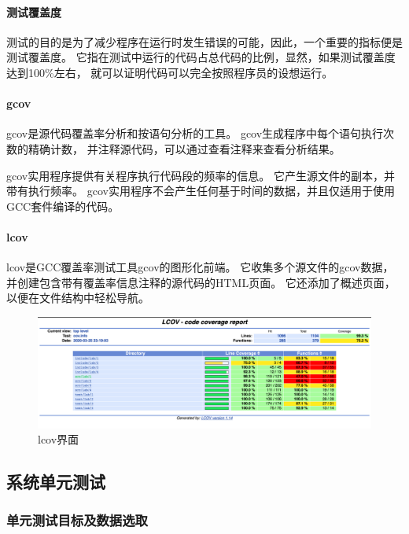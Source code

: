 \paragraph{测试覆盖度}

测试的目的是为了减少程序在运行时发生错误的可能，因此，一个重要的指标便是测试覆盖度。
它指在测试中运行的代码占总代码的比例，显然，如果测试覆盖度达到100\%左右，
就可以证明代码可以完全按照程序员的设想运行。

\paragraph{gcov}

gcov是源代码覆盖率分析和按语句分析的工具。
gcov生成程序中每个语句执行次数的精确计数，
并注释源代码，可以通过查看注释来查看分析结果。

gcov实用程序提供有关程序执行代码段的频率的信息。
它产生源文件的副本，并带有执行频率。
gcov实用程序不会产生任何基于时间的数据，并且仅适用于使用GCC套件编译的代码。

\paragraph{lcov}

lcov是GCC覆盖率测试工具gcov的图形化前端。
它收集多个源文件的gcov数据，
并创建包含带有覆盖率信息注释的源代码的HTML页面。
它还添加了概述页面，以便在文件结构中轻松导航。

\begin{figure}[hbt]
  \centering
  \includegraphics[scale=.3]{lcov.png}
  \caption{lcov界面}
\end{figure}

\subsection{系统单元测试}

\subsubsection{单元测试目标及数据选取}

